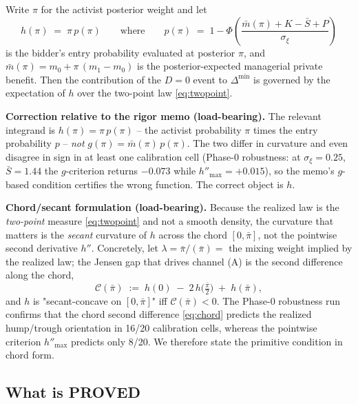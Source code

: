 Write $\pi$ for the activist posterior weight and let
\begin{equation}
  h(\pi)\;=\;\pi\,p(\pi)
  \qquad\text{where}\qquad
  p(\pi)\;=\;1-\Phi\!\left(\frac{\bar m(\pi)+K-\bar S+P}{\sigma_\xi}\right)
  \label{eq:hdef}
\end{equation}
is the bidder's entry probability evaluated at posterior $\pi$, and
$\bar m(\pi)=m_0+\pi\,(m_1-m_0)$ is the posterior-expected managerial private
benefit. Then the contribution of the $D=0$ event to $\Delta^{\min}$ is
governed by the expectation of $h$ over the two-point law \eqref{eq:twopoint}.

\medskip
\noindent\textbf{Correction relative to the rigor memo (load-bearing).} The
relevant integrand is $h(\pi)=\pi\,p(\pi)$ -- the activist probability $\pi$
times the entry probability $p$ -- \emph{not} $g(\pi)=\bar m(\pi)\,p(\pi)$. The
two differ in curvature and even disagree in sign in at least one calibration
cell (Phase-0 robustness: at $\sigma_\xi=0.25$, $\bar S=1.44$ the
$g$-criterion returns $-0.073$ while $h''_{\max}=+0.015$), so the memo's
$g$-based condition certifies the wrong function. The correct object is $h$.

\medskip
\noindent\textbf{Chord/secant formulation (load-bearing).} Because the realized
law is the \emph{two-point} measure \eqref{eq:twopoint} and not a smooth
density, the curvature that matters is the \emph{secant} curvature of $h$ across
the chord $[0,\bar\pi]$, not the pointwise second derivative $h''$. Concretely,
let $\lambda=\bar\pi/(\bar\pi)=$ the mixing weight implied by the realized law;
the Jensen gap that drives channel (A) is the second difference along the chord,
\begin{equation}
  \mathcal{C}(\bar\pi)
  \;:=\;
  h(0)\;-\;2\,h\!\big(\tfrac{\bar\pi}{2}\big)\;+\;h(\bar\pi),
  \label{eq:chord}
\end{equation}
and $h$ is "secant-concave on $[0,\bar\pi]$" iff $\mathcal{C}(\bar\pi)<0$. The
Phase-0 robustness run confirms that the chord second difference
\eqref{eq:chord} predicts the realized hump/trough orientation in 16/20
calibration cells, whereas the pointwise criterion $h''_{\max}$ predicts only
8/20. We therefore state the primitive condition in chord form.

\subsection*{What is PROVED}

